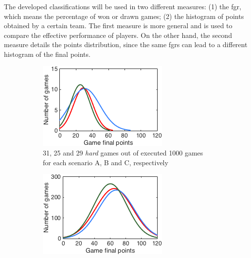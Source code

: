 The developed classifications will be used in two different measures: (1) the \ac{fgr}, which means the percentage of won or drawn games; (2) the histogram of points obtained by a certain team.
The first measure is more general and is used to compare the effective performance of players.
On the other hand, the second measure details the points distribution, since the same \acp{fgr} can lead to a different histogram of the final points.

\begin{figure}[h]
        \centering
        \begin{subfigure}[h]{0.32\textwidth}
                \includegraphics[width=\textwidth]{./img/4/ABChard}
                \caption{31, 25 and 29 \emph{hard} games out of executed 1000 games for each scenario A, B and C, respectively}
                \label{fig:ABC-Hhard}
        \end{subfigure}
        \begin{subfigure}[h]{0.32\textwidth}
                \includegraphics[width=\textwidth]{./img/4/ABCmedium}

\end{subfigure}
\end{figure}

